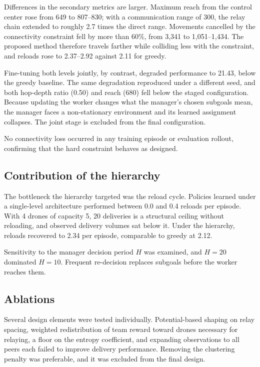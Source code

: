 \documentclass[12pt]{article}
\begin{document}
Differences in the secondary metrics are larger. Maximum reach from the control center rose from
649 to 807--830; with a communication range of 300, the relay chain extended to roughly 2.7 times
the direct range. Movements cancelled by the connectivity constraint fell by more than 60\%, from
3,341 to 1,051--1,434. The proposed method therefore travels farther while colliding less with the
constraint, and reloads rose to 2.37--2.92 against 2.11 for greedy.

Fine-tuning both levels jointly, by contrast, degraded performance to 21.43, below the greedy
baseline. The same degradation reproduced under a different seed, and both hop-depth ratio (0.50)
and reach (680) fell below the staged configuration. Because updating the worker changes what the
manager's chosen subgoals mean, the manager faces a non-stationary environment and its learned
assignment collapses. The joint stage is excluded from the final configuration.

No connectivity loss occurred in any training episode or evaluation rollout, confirming that the
hard constraint behaves as designed.

\subsection{Contribution of the hierarchy}

The bottleneck the hierarchy targeted was the reload cycle. Policies learned under a single-level
architecture performed between 0.0 and 0.4 reloads per episode. With 4 drones of capacity 5,
20 deliveries is a structural ceiling without reloading, and observed delivery volumes sat below
it. Under the hierarchy, reloads recovered to 2.34 per episode, comparable to greedy at 2.12.

Sensitivity to the manager decision period $H$ was examined, and $H=20$ dominated $H=10$.
Frequent re-decision replaces subgoals before the worker reaches them.

\subsection{Ablations}

Several design elements were tested individually. Potential-based shaping on relay spacing,
weighted redistribution of team reward toward drones necessary for relaying, a floor on the entropy
coefficient, and expanding observations to all peers each failed to improve delivery performance.
Removing the clustering penalty was preferable, and it was excluded from the final design.
\end{document}
